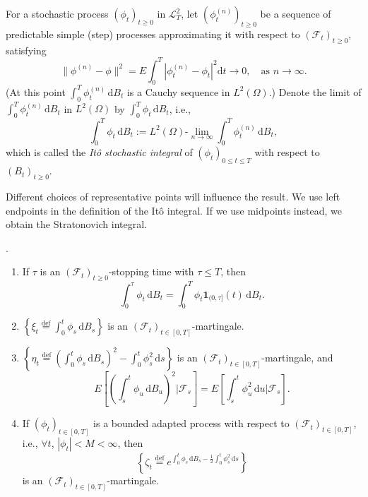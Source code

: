 \begin{defn}
For a stochastic process $(\phi_t)_{t \geq 0}$ in $\mathscr{L}_T^2$, let $(\phi_t^{(n)})_{t \geq 0}$ be a sequence of predictable simple (step) processes approximating it with respect to $(\mathcal{F}_t)_{t \geq 0}$, satisfying
\[
\|\phi^{(n)} - \phi\|^2 = E \int_0^T \left|\phi_t^{(n)} - \phi_t\right|^2 \mathrm{d}t \to 0, \quad \text{as } n \to \infty.
\]
(At this point $\int_0^T \phi_t^{(n)} \, \mathrm{d}B_t$ is a Cauchy sequence in $L^2(\Omega)$.) Denote the limit of $\int_0^T \phi_t^{(n)} \, \mathrm{d}B_t$ in $L^2(\Omega)$ by $\int_0^T \phi_t \, \mathrm{d}B_t$, i.e.,
\[
\int_0^T \phi_t \, \mathrm{d}B_t := L^2(\Omega)\text{-}\lim_{n \to \infty} \int_0^T \phi_t^{(n)} \, \mathrm{d}B_t,
\]
which is called the \textit{It\^{o} stochastic integral} of $(\phi_t)_{0 \leq t \leq T}$ with respect to $(B_t)_{t \geq 0}$.
\end{defn}
\begin{rem}
    Different choices of representative points will influence the result. We use left endpoints in the definition of the Itô integral. If we use midpoints instead, we obtain the Stratonovich integral.
\end{rem}
\begin{prop}
.
\begin{enumerate}
    \item If $\tau$ is an $(\mathcal{F}_t)_{t \geq 0}$-stopping time with $\tau \leq T$, then
    \[
    \int_0^{\tau} \phi_t \, \mathrm{d}B_t = \int_0^{T} \phi_t \mathbf{1}_{(0,\tau]}(t) \, \mathrm{d}B_t.
    \]

    \item $\left\{\xi_t \overset{\mathrm{def}}{=} \int_0^t \phi_s \, \mathrm{d}B_s\right\}$ is an $(\mathcal{F}_t)_{t \in [0,T]}$-martingale.

    \item $\left\{\eta_t \overset{\mathrm{def}}{=} \left(\int_0^t \phi_s \, \mathrm{d}B_s\right)^2 - \int_0^t \phi_s^2 \, \mathrm{d}s\right\}$ is an $(\mathcal{F}_t)_{t \in [0,T]}$-martingale, and
    \[
    E\left[\left(\int_s^t \phi_u \, \mathrm{d}B_u\right)^2 \bigg| \mathcal{F}_s\right] = E\left[\int_s^t \phi_u^2 \, \mathrm{d}u \bigg| \mathcal{F}_s\right].
    \]

    \item If $(\phi_t)_{t \in [0,T]}$ is a bounded adapted process with respect to $(\mathcal{F}_t)_{t \in [0,T]}$, i.e., $\forall t$, $|\phi_t| < M < \infty$, then
    \[
    \left\{\zeta_t \overset{\mathrm{def}}{=} e^{\int_0^t \phi_s \, \mathrm{d}B_s - \frac{1}{2}\int_0^t \phi_s^2 \, \mathrm{d}s}\right\}
    \]
    is an $(\mathcal{F}_t)_{t \in [0,T]}$-martingale.
\end{enumerate}
\end{prop}

